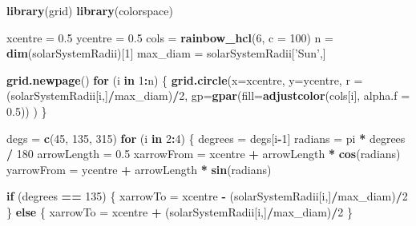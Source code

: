 \documentclass[9pt,letter]{article}
\newenvironment{Shaded}{\begin{snugshade}}{\end{snugshade}}
\newcommand{\KeywordTok}[1]{\textcolor[rgb]{0.13,0.29,0.53}{\textbf{#1}}}
\newcommand{\DataTypeTok}[1]{\textcolor[rgb]{0.13,0.29,0.53}{#1}}
\newcommand{\DecValTok}[1]{\textcolor[rgb]{0.00,0.00,0.81}{#1}}
\newcommand{\FloatTok}[1]{\textcolor[rgb]{0.00,0.00,0.81}{#1}}
\newcommand{\StringTok}[1]{\textcolor[rgb]{0.31,0.60,0.02}{#1}}
\newcommand{\ControlFlowTok}[1]{\textcolor[rgb]{0.13,0.29,0.53}{\textbf{#1}}}
\newcommand{\OperatorTok}[1]{\textcolor[rgb]{0.81,0.36,0.00}{\textbf{#1}}}
\newcommand{\NormalTok}[1]{#1}
\begin{document}
\begin{Shaded}
\begin{Highlighting}[]
\KeywordTok{library}\NormalTok{(grid)}
\KeywordTok{library}\NormalTok{(colorspace)}

\NormalTok{xcentre =}\StringTok{ }\FloatTok{0.5}
\NormalTok{ycentre =}\StringTok{ }\FloatTok{0.5}
\NormalTok{cols =}\StringTok{ }\KeywordTok{rainbow_hcl}\NormalTok{(}\DecValTok{6}\NormalTok{, }\DataTypeTok{c =} \DecValTok{100}\NormalTok{)}
\NormalTok{n =}\StringTok{ }\KeywordTok{dim}\NormalTok{(solarSystemRadii)[}\DecValTok{1}\NormalTok{]}
\NormalTok{max_diam =}\StringTok{ }\NormalTok{solarSystemRadii[}\StringTok{'Sun'}\NormalTok{,]}
  
\KeywordTok{grid.newpage}\NormalTok{()}
\ControlFlowTok{for}\NormalTok{ (i }\ControlFlowTok{in} \DecValTok{1}\OperatorTok{:}\NormalTok{n) \{}
  \KeywordTok{grid.circle}\NormalTok{(}\DataTypeTok{x=}\NormalTok{xcentre,}
              \DataTypeTok{y=}\NormalTok{ycentre,}
              \DataTypeTok{r =}\NormalTok{ (solarSystemRadii[i,]}\OperatorTok{/}\NormalTok{max_diam)}\OperatorTok{/}\DecValTok{2}\NormalTok{,}
              \DataTypeTok{gp=}\KeywordTok{gpar}\NormalTok{(}\DataTypeTok{fill=}\KeywordTok{adjustcolor}\NormalTok{(cols[i], }\DataTypeTok{alpha.f =} \FloatTok{0.5}\NormalTok{))}
\NormalTok{  )}
\NormalTok{\}}

\NormalTok{degs =}\StringTok{ }\KeywordTok{c}\NormalTok{(}\DecValTok{45}\NormalTok{, }\DecValTok{135}\NormalTok{, }\DecValTok{315}\NormalTok{)}
\ControlFlowTok{for}\NormalTok{ (i }\ControlFlowTok{in} \DecValTok{2}\OperatorTok{:}\DecValTok{4}\NormalTok{) \{}
\NormalTok{  degrees =}\StringTok{ }\NormalTok{degs[i}\OperatorTok{-}\DecValTok{1}\NormalTok{]}
\NormalTok{  radians =}\StringTok{ }\NormalTok{pi }\OperatorTok{*}\StringTok{ }\NormalTok{degrees }\OperatorTok{/}\StringTok{ }\DecValTok{180}
\NormalTok{  arrowLength =}\StringTok{ }\FloatTok{0.5} 
\NormalTok{  xarrowFrom =}\StringTok{ }\NormalTok{xcentre }\OperatorTok{+}\StringTok{ }\NormalTok{arrowLength }\OperatorTok{*}\StringTok{ }\KeywordTok{cos}\NormalTok{(radians)}
\NormalTok{  yarrowFrom =}\StringTok{ }\NormalTok{ycentre }\OperatorTok{+}\StringTok{ }\NormalTok{arrowLength }\OperatorTok{*}\StringTok{ }\KeywordTok{sin}\NormalTok{(radians)}
  
  \ControlFlowTok{if}\NormalTok{ (degrees }\OperatorTok{==}\StringTok{ }\DecValTok{135}\NormalTok{) \{}
\NormalTok{    xarrowTo =}\StringTok{ }\NormalTok{xcentre }\OperatorTok{-}\StringTok{ }\NormalTok{(solarSystemRadii[i,]}\OperatorTok{/}\NormalTok{max_diam)}\OperatorTok{/}\DecValTok{2}
\NormalTok{  \} }\ControlFlowTok{else}\NormalTok{ \{}
\NormalTok{    xarrowTo =}\StringTok{ }\NormalTok{xcentre }\OperatorTok{+}\StringTok{ }\NormalTok{(solarSystemRadii[i,]}\OperatorTok{/}\NormalTok{max_diam)}\OperatorTok{/}\DecValTok{2}
\NormalTok{  \}}
  

\end{Highlighting}
\end{Shaded}
\end{document}
